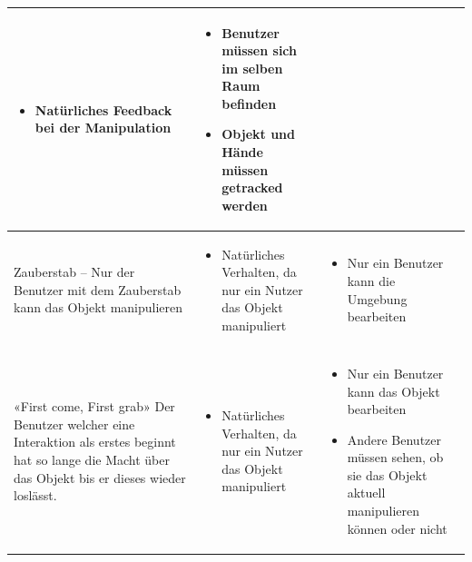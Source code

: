 \begin{center}
\begin{tabularx} {\textwidth} { | B | B | B | }
\begin{itemize} [leftmargin=*,noitemsep,topsep=0pt]
			\item Natürliches Feedback bei der Manipulation
		\end{itemize} & 
		\begin{itemize} [leftmargin=*,noitemsep,topsep=0pt]
			\item Benutzer müssen sich im selben Raum befinden
			\item Objekt und Hände müssen getracked werden
		\end{itemize} \\
		\hline
		\vspace{1pt}
		Zauberstab – Nur der Benutzer mit dem Zauberstab kann das Objekt manipulieren &
		\begin{itemize} [leftmargin=*,noitemsep,topsep=0pt]
			\item Natürliches Verhalten, da nur ein Nutzer das Objekt manipuliert
		\end{itemize} &
		\begin{itemize} [leftmargin=*,noitemsep,topsep=0pt]
			\item Nur ein Benutzer kann die Umgebung bearbeiten
		\end{itemize} \\
		\hline	
		\vspace{1pt}
		«First come, First grab» Der Benutzer welcher eine Interaktion als erstes beginnt hat so lange die Macht über das Objekt bis er dieses wieder loslässt. & 
		\begin{itemize} [leftmargin=*,noitemsep,topsep=0pt]
			\item Natürliches Verhalten, da nur ein Nutzer das Objekt manipuliert
		\end{itemize} &
		\begin{itemize} [leftmargin=*,noitemsep,topsep=0pt]
			\item Nur ein Benutzer kann das Objekt bearbeiten
			\item Andere Benutzer müssen sehen, ob sie das Objekt aktuell manipulieren können oder nicht
		\end{itemize} \\
		\hline	
	\end{tabularx}
\end{center}
\label{tbl:varianten_gleichzeitige_interaktion}

